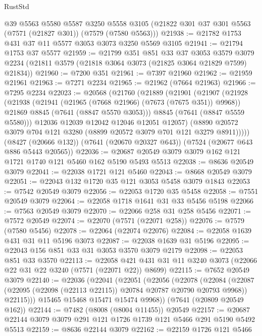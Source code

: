 \begin{lexlean}{RustStd}
\begin{coremodule}
    @39
    @5563
    @5580
    @5587
    @3250
    @5558
    @3105
    (@21822 @301 @37 @301 @5563 (@7571 (@21827 @301)) (@7579 (@7580 @5563)))
@21938 := @21782 @1753 @431 @37 @11 @5577 @3053 @3073 @3250 @5569 @3105
@21941 := @21794 @1753 @37 @5577
@21959 := @21799
    @351
    @851
    @33
    @37
    @3053
    @3579
    @3079
    @2234
    (@21811 @3579 (@21818 @3064 @3073 (@21825 @3064 @21829 @7599) @21834))
@21960 := @7200 @351
@21961 := @7397 @21960
@21962 := @21959 @21961
@21963 := @7271 @2234
@21965 := @21962 (@7664 @21963)
@21966 := @7295 @2234
@22023 := @20568
    (@21760
      (@21889
        (@21901
          (@21907
            (@21928
              (@21938
                (@21941 (@21965 (@7668 @21966) (@7673 (@7675 @351)) @9968))
                @21869
                @8845
                (@7641 (@8847 @5570 @3053)))
              @8845
              (@7641 (@8847 @5559 @5580)))
            @12036
            @12039
            @12042
            @12046
            @12051
            @12057)
          (@8890 @20572 @3079 @704 @121 @3280 (@8899 @20572 @3079 @701 @121 @3279 @8911)))))
    (@8427 (@20666 @132))
    (@7641 (@20670 @20327 @643))
    (@7524 (@20677 @643 @886 @5443 @20565))
@22036 := @20687 @20549 @3079 @3079 @162 @121 @1721 @1740 @121 @5460 @162 @5190 @5493 @5513
@22038 := @8636 @20549 @3079
@22041 := @22038 @1721 @121 @5460
@22043 := @8668 @20549 @3079
@22051 := @22043 @132 @1720 @35 @121 @3053 @5458 @3079 @1843
@22053 := @7542 @20549 @3079
@22056 := @22053 @1720 @35 @5458
@22058 := @7551 @20549 @3079
@22064 := @22058 @1718 @1641 @31 @33 @5456 @5198
@22066 := @7563 @20549 @3079
@22070 := @22066 @258 @31 @258 @5456
@22071 := @7572 @20549
@22074 := @22070 (@7571 (@22071 @258))
@22076 := @7579 (@7580 @5456)
@22078 := @22064 (@22074 @22076)
@22084 := @22058 @1639 @431 @31 @11 @5196 @3073
@22087 := @22038 @1639 @31 @5196
@22095 := @22043 @156 @851 @33 @31 @3053 @3570 @3079 @2179
@22098 := @22053 @851 @33 @3570
@22113 := @22058 @421 @431 @31 @11 @3240 @3073 (@22066 @22 @31 @22 @3240 (@7571 (@22071 @22)) @8699)
@22115 := @7652 @20549 @3079
@22140 := @22036
    (@22041
      (@22051
        (@22056
          (@22078
            (@22084
              (@22087 (@22095 (@22098 (@22113 @22115)) @20784 @20787 @20790 @20793 @9968))
              @22115)))
        @15465
        @15468
        @15471
        @15474
        @9968))
    (@7641 (@20809 @20549 @162))
@22144 := @7482 (@8008 (@8004 @11455)) @20549
@22157 := @20687 @22144 @3079 @3079 @291 @121 @1726 @1739 @121 @5466 @291 @5190 @5492 @5513
@22159 := @8636 @22144 @3079
@22162 := @22159 @1726 @121 @5466

\end{coremodule}
\end{lexlean}
